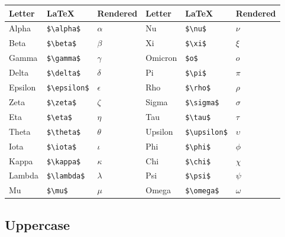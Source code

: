 \documentclass[
  letterpaper,
  DIV=11,
  numbers=noendperiod]{scrartcl}
\begin{document}
\begin{longtable}[]{@{}llllll@{}}
\toprule()
Letter & LaTeX & Rendered & Letter & LaTeX & Rendered \\
\midrule()
\endhead
Alpha & \texttt{\$\textbackslash{}alpha\$} & \(\alpha\) & Nu &
\texttt{\$\textbackslash{}nu\$} & \(\nu\) \\
Beta & \texttt{\$\textbackslash{}beta\$} & \(\beta\) & Xi &
\texttt{\$\textbackslash{}xi\$} & \(\xi\) \\
Gamma & \texttt{\$\textbackslash{}gamma\$} & \(\gamma\) & Omicron &
\texttt{\$o\$} & \(o\) \\
Delta & \texttt{\$\textbackslash{}delta\$} & \(\delta\) & Pi &
\texttt{\$\textbackslash{}pi\$} & \(\pi\) \\
Epsilon & \texttt{\$\textbackslash{}epsilon\$} & \(\epsilon\) & Rho &
\texttt{\$\textbackslash{}rho\$} & \(\rho\) \\
Zeta & \texttt{\$\textbackslash{}zeta\$} & \(\zeta\) & Sigma &
\texttt{\$\textbackslash{}sigma\$} & \(\sigma\) \\
Eta & \texttt{\$\textbackslash{}eta\$} & \(\eta\) & Tau &
\texttt{\$\textbackslash{}tau\$} & \(\tau\) \\
Theta & \texttt{\$\textbackslash{}theta\$} & \(\theta\) & Upsilon &
\texttt{\$\textbackslash{}upsilon\$} & \(\upsilon\) \\
Iota & \texttt{\$\textbackslash{}iota\$} & \(\iota\) & Phi &
\texttt{\$\textbackslash{}phi\$} & \(\phi\) \\
Kappa & \texttt{\$\textbackslash{}kappa\$} & \(\kappa\) & Chi &
\texttt{\$\textbackslash{}chi\$} & \(\chi\) \\
Lambda & \texttt{\$\textbackslash{}lambda\$} & \(\lambda\) & Psi &
\texttt{\$\textbackslash{}psi\$} & \(\psi\) \\
Mu & \texttt{\$\textbackslash{}mu\$} & \(\mu\) & Omega &
\texttt{\$\textbackslash{}omega\$} & \(\omega\) \\
\bottomrule()
\end{longtable}

\hypertarget{uppercase}{%
\subsection{Uppercase}\label{uppercase}}
\end{document}
